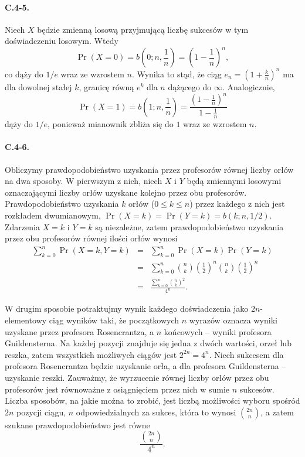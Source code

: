 \paragraph{C.4-5.}
Niech $X$ będzie zmienną losową przyjmującą liczbę sukcesów w tym doświadczeniu losowym. Wtedy
\[
	\Pr(X=0) = b\left(0;n,\frac{1}{n}\right) = \left(1-\frac{1}{n}\right)^n,
\]
co dąży do $1/e$ wraz ze wzrostem $n$. Wynika to stąd, że ciąg $e_n=\left(1+\frac{k}{n}\right)^n$ ma dla dowolnej stałej $k$, granicę równą $e^k$ dla $n$ dążącego do $\infty$.
Analogicznie,
\[
	\Pr(X=1) = b\left(1;n,\frac{1}{n}\right) = \frac{\left(1-\frac{1}{n}\right)^n}{1-\frac{1}{n}}
\]
dąży do $1/e$, ponieważ mianownik zbliża się do $1$ wraz ze wzrostem $n$.

\paragraph{C.4-6.}
Obliczymy prawdopodobieństwo uzyskania przez profesorów równej liczby orłów na dwa sposoby. W pierwszym z nich, niech $X$ i $Y$ będą zmiennymi losowymi oznaczającymi liczby orłów uzyskane kolejno przez obu profesorów. Prawdopodobieństwo uzyskania $k$ orłów ($0\le k\le n$) przez każdego z nich jest rozkładem dwumianowym, $\Pr(X=k) = \Pr(Y=k) = b(k;n,1/2)$. Zdarzenia $X=k$ i $Y=k$ są niezależne, zatem prawdopodobieństwo uzyskania przez obu profesorów równej ilości orłów wynosi
\begin{eqnarray*}
	\sum_{k=0}^n\Pr(X=k,Y=k) &=& \sum_{k=0}^n\Pr(X=k)\Pr(Y=k) \\
	&=& \sum_{k=0}^n\binom{n}{k}\left(\frac{1}{2}\right)^n\binom{n}{k}\left(\frac{1}{2}\right)^n \\
	&=& \frac{\sum_{k=0}^n\binom{n}{k}^2}{4^n}.
\end{eqnarray*}

W drugim sposobie potraktujmy wynik każdego doświadczenia jako $2n$-elementowy ciąg wyników taki, że początkowych $n$ wyrazów oznacza wyniki uzyskane przez profesora Rosencrantza, a $n$ końcowych -- wyniki profesora Guildensterna. Na każdej pozycji znajduje się jedna z dwóch wartości, orzeł lub reszka, zatem wszystkich możliwych ciągów jest $2^{2n}=4^n$. Niech sukcesem dla profesora Rosencrantza będzie uzyskanie orła, a dla profesora Guildensterna -- uzyskanie reszki. Zauważmy, że wyrzucenie równej liczby orłów przez obu profesorów jest równoważne z osiągnięciem przez nich w sumie $n$ sukcesów. Liczba sposobów, na jakie można to zrobić, jest liczbą możliwości wyboru spośród $2n$ pozycji ciągu, $n$ odpowiedzialnych za sukces, która to wynosi $\binom{2n}{n}$, a zatem szukane prawdopodobieństwo jest równe
\[
	\frac{\binom{2n}{n}}{4^n}.
\]

